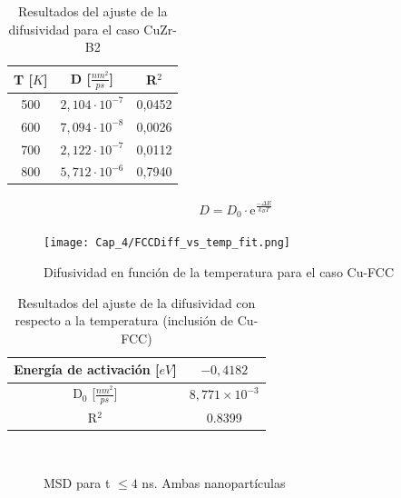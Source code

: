 \begin{table}[htp]
\caption{Resultados del ajuste de la difusividad para el caso CuZr-B2}
\begin{center}
\begin{tabular}{*{3}{c}}
\hline
T [$K$] & D [$\frac{nm^{2}}{ps}$] & R$^{2}$ \\
\hline \hline
500 & $2,104\cdot 10^{-7}$ & 0,0452 \\
\hline
600 & $7,094\cdot 10^{-8}$ & 0,0026 \\
\hline
700 & $2,122\cdot 10^{-7}$ & 0,0112 \\
\hline
800 & $5,712\cdot 10^{-6}$ & 0,7940 \\
\hline
\end{tabular}
\end{center}
\label{C4:tb:B2_Diff_Fit_Restults}
\end{table}

\begin{eqnarray}
D = D_{0}\cdot \mathrm{e}^{\frac{-\Delta E}{k_{B} T}}
\label{C4:eq:diff_Fit}
\end{eqnarray}

\begin{figure}[htp]
\centering
\texttt{[image: Cap\_4/FCCDiff\_vs\_temp\_fit.png]}
\caption[Difusividad en función de la temperatura (Cu-FCC)]{Difusividad en función de la temperatura para el caso Cu-FCC}
\label{C4:fg:FCC_diff_vs_T}
\end{figure}

\begin{table}[htp]
\caption{Resultados del ajuste de la difusividad con respecto a la temperatura (inclusión de Cu-FCC)}
\begin{center}
\begin{tabular}{*{2}{c}}
\hline
Energía de activación [$eV$]& $-0,4182$ \\
\hline \hline
D$_{0}$ [$\frac{nm^{2}}{ps}$] & $8,771\times 10^{-3}$\\
\hline
R$^{2}$ & 0.8399 \\
\hline
\end{tabular}
\end{center}
\label{C4:tb:FCC_Diff_VS_T_Fit_Restults}
\end{table}

\begin{figure}[htp]
\centering
{}
\\
\caption[MSD para t $ \leq 4 $ ns. Ambas nanopartículas]{MSD para t $ \leq 4 $ ns. Ambas nanopartículas}
\label{C4:fg:heating_FCC_B2}
\end{figure}

